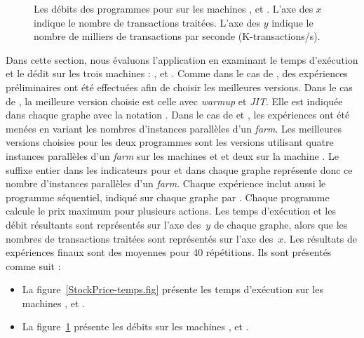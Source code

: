 \begin{figure}




\caption[Les débits pour  sur
les machines ,  et .]{Les débits des programmes
pour  sur les machines ,  et . L'axe des $x$
indique le nombre de transactions traitées. L'axe des $y$ indique le nombre de milliers de transactions par seconde (K-transactions/s).}
\label{StockPrice-debits.fig}
\end{figure}


Dans cette section, nous \'evaluons l'application  en examinant le temps d'ex\'ecution et le d\'edit sur les trois machines : ,  et . Comme dans le cas de , des exp\'eriences pr\'eliminaires ont \'et\'e effectu\'ees afin de choisir les meilleures versions. Dans le cas de , la meilleure version choisie est celle avec \emph{warmup} et \emph{JIT}. Elle est indiqu\'ee dans chaque graphe avec la notation . Dans le cas de  et , les exp\'eriences ont \'et\'e men\'ees en variant les nombres d'instances parall\`eles d'un \emph{farm}. Les meilleures versions choisies pour les deux programmes sont les versions utilisant quatre instances parall\`eles d'un \emph{farm} sur les machines  et  et deux sur la machine . Le suffixe entier dans les indicateurs pour  et  dans chaque graphe repr\'esente donc ce nombre d'instances parall\`eles d'un \emph{farm}. Chaque exp\'erience inclut aussi le programme s\'equentiel, indiqu\'e sur chaque graphe par . Chaque programme calcule le prix maximum pour plusieurs actions. Les temps d'ex\'ecution et les d\'ebit r\'esultants sont repr\'esent\'es sur l'axe des~$y$ de chaque graphe, alors que les nombres de transactions trait\'ees sont repr\'esent\'es sur l'axe des~$x$. Les r\'esultats de exp\'eriences finaux sont des moyennes pour 40 r\'ep\'etitions. Ils sont pr\'esent\'es comme suit :


\begin{itemize}

\item La figure~\ref{StockPrice-temps.fig} pr\'esente les temps d'ex\'ecution sur les machines ,  et .

\item La figure~\ref{StockPrice-debits.fig} pr\'esente les d\'ebits sur les machines ,  et .

\end{itemize}


